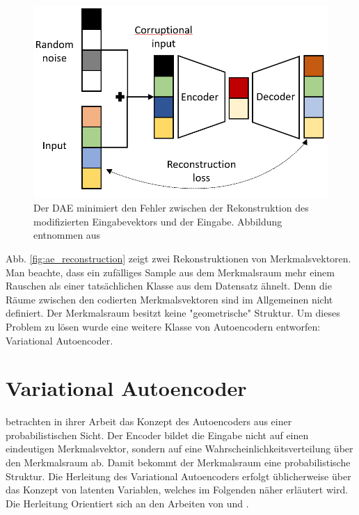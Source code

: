 \begin{figure}[hbt]
  \centering
  \includegraphics[width=.6\textwidth]{gfx/literature/dae}
  \caption{Der DAE minimiert den Fehler zwischen der Rekonstruktion des modifizierten Eingabevektors und der Eingabe. Abbildung entnommen aus \cite{LopezPinaya2019}}
\end{figure}

Abb. \ref{fig:ae_reconstruction} zeigt zwei Rekonstruktionen von Merkmalsvektoren. Man beachte, dass ein zufälliges Sample aus dem Merkmalsraum mehr einem Rauschen als einer tatsächlichen Klasse aus dem Datensatz ähnelt. Denn die Räume zwischen den codierten Merkmalsvektoren sind im Allgemeinen nicht definiert. Der Merkmalsraum besitzt keine "geometrische" Struktur. Um dieses Problem zu lösen wurde eine weitere Klasse von Autoencodern entworfen: Variational Autoencoder.



\section{Variational Autoencoder}\label{sec:VAE_introduction}\label{sec:variational_autoencoder}
\cite{Kingma2014} betrachten in ihrer Arbeit das Konzept des Autoencoders aus einer probabilistischen Sicht. Der Encoder bildet die Eingabe nicht auf einen eindeutigen Merkmalsvektor, sondern auf eine Wahrscheinlichkeitsverteilung über den Merkmalsraum ab. Damit bekommt der Merkmalsraum eine probabilistische Struktur. Die Herleitung des Variational Autoencoders erfolgt üblicherweise über das Konzept von latenten Variablen, welches im Folgenden näher erläutert wird. Die Herleitung Orientiert sich an den Arbeiten von \cite{Kingma2014} und \cite{Doersch2016}.


